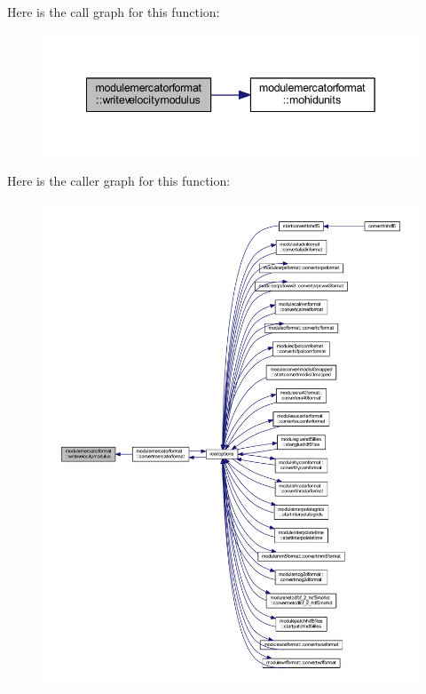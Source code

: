 Here is the call graph for this function\+:\nopagebreak
\begin{figure}[H]
\begin{center}
\leavevmode
\includegraphics[width=342pt]{namespacemodulemercatorformat_a5f3b3ad2a9dc5c613cf6911d366fdc46_cgraph}
\end{center}
\end{figure}
Here is the caller graph for this function\+:\nopagebreak
\begin{figure}[H]
\begin{center}
\leavevmode
\includegraphics[width=350pt]{namespacemodulemercatorformat_a5f3b3ad2a9dc5c613cf6911d366fdc46_icgraph}
\end{center}
\end{figure}


